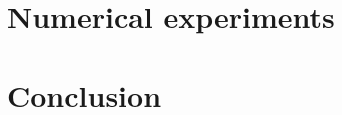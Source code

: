 \documentclass[a4paper]{article}
\begin{document}


\section{Numerical experiments}\label{sec:numerical-experiments}



\section{Conclusion}\label{sec:conclusion}

\end{document}
